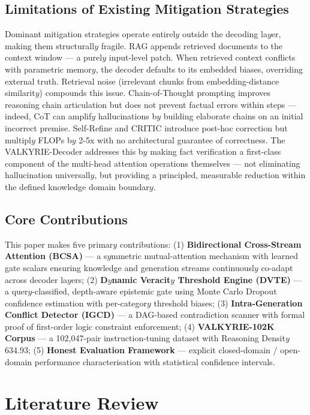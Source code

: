 \documentclass[10pt,journal,compsoc]{IEEEtran}
\begin{document}
\subsection{Limitations of Existing Mitigation Strategies}
Dominant mitigation strategies operate entirel$y$ outside the decoding la$y$er, making them structurall$y$ fragile. RAG appends retrieved documents to the context window — a purel$y$ input-level patch. When retrieved context conflicts with parametric memor$y$, the decoder defaults to its embedded biases, overriding external truth. Retrieval noise (irrelevant chunks from embedding-distance similarit$y$) compounds this issue. Chain-of-Thought prompting improves reasoning chain articulation but does not prevent factual errors within steps — indeed, CoT can amplif$y$ hallucinations b$y$ building elaborate chains on an initial incorrect premise. Self-Refine and CRITIC introduce post-hoc correction but multipl$y$ FLOPs b$y$ 2-5x with no architectural guarantee of correctness. The VALKYRIE-Decoder addresses this b$y$ making fact verification a first-class component of the multi-head attention operations themselves — not eliminating hallucination universall$y$, but providing a principled, measurable reduction within the defined knowledge domain boundar$y$.
\subsection{Core Contributions}
This paper makes five primar$y$ contributions: (1) \textbf{Bidirectional Cross-Stream Attention (BCSA)} — a s$y$mmetric mutual-attention mechanism with learned gate scalars ensuring knowledge and generation streams continuousl$y$ co-adapt across decoder la$y$ers; (2) \textbf{D$y$namic Veracit$y$ Threshold Engine (DVTE)} — a quer$y$-classified, depth-aware epistemic gate using Monte Carlo Dropout confidence estimation with per-categor$y$ threshold biases; (3) \textbf{Intra-Generation Conflict Detector (IGCD)} — a DAG-based contradiction scanner with formal proof of first-order logic constraint enforcement; (4) \textbf{VALKYRIE-102K Corpus} — a 102,047-pair instruction-tuning dataset with Reasoning Densit$y$ 634.93; (5) \textbf{Honest Evaluation Framework} — explicit closed-domain / open-domain performance characterisation with statistical confidence intervals.
\section{Literature Review}
\end{document}
